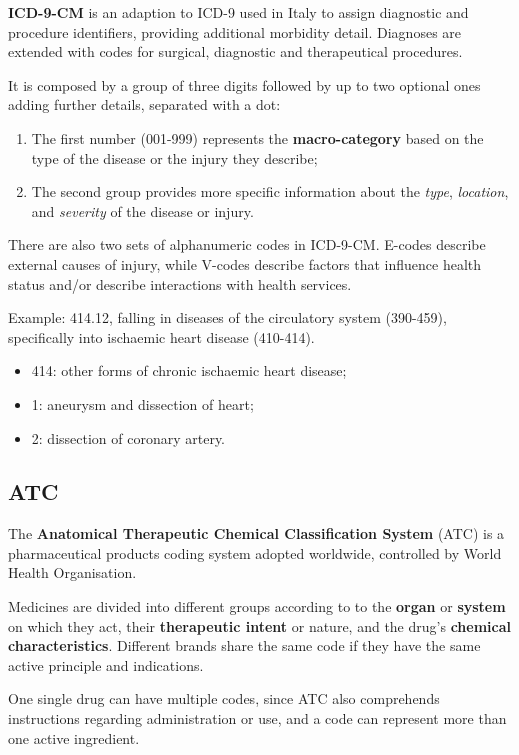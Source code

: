 \textbf{ICD-9-CM} is an adaption to ICD-9 used in Italy to assign diagnostic and procedure identifiers, providing additional morbidity detail. Diagnoses are extended with codes for surgical, diagnostic and therapeutical procedures. 

It is composed by a group of three digits followed by up to two optional ones adding further details, separated with a dot:
\begin{enumerate}
	\item The first number (001-999) represents the \textbf{macro-category} based on the type of the disease or the injury they describe;
	\item The second group provides more specific information about the \textit{type}, \textit{location}, and \textit{severity} of the disease or injury.
\end{enumerate}

There are also two sets of alphanumeric codes in ICD-9-CM. E-codes describe external causes of injury, while V-codes describe factors that influence health status and/or describe interactions with health services\cite{icd9en}.

Example: 414.12, falling in diseases of the circulatory system (390-459), specifically into ischaemic heart disease (410-414).
\begin{itemize}
	\item 414: other forms of chronic ischaemic heart disease;
		\item 1: aneurysm and dissection of heart;
			\item 2: dissection of coronary artery.
\end{itemize}

\subsection{ATC}
The \textbf{Anatomical Therapeutic Chemical Classification System} (ATC) is a pharmaceutical products coding system adopted worldwide, controlled by World Health Organisation.

Medicines are divided into different groups according to to the \textbf{organ} or \textbf{system} on which they act, their \textbf{therapeutic intent} or nature, and the drug's \textbf{chemical characteristics}. Different brands share the same code if they have the same active principle and indications.

One single drug can have multiple codes, since ATC also comprehends instructions regarding administration or use, and a code can represent more than one active ingredient.

